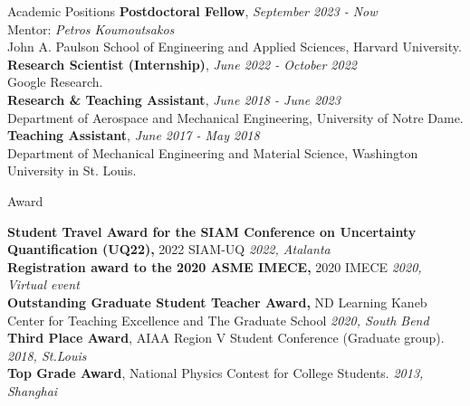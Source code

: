 \documentclass{resume} %
\begin{document}
\begin{rSection}{Academic Positions}
\textbf{Postdoctoral Fellow}, \hfill{\em September 2023 - Now}\\
Mentor: \textit{Petros Koumoutsakos}
\\John A. Paulson School of Engineering and Applied Sciences, Harvard University.\\	
\textbf{Research Scientist (Internship)}, \hfill{\em June 2022 - October 2022} 
\\Google Research.\\
\textbf{Research \& Teaching Assistant}, \hfill{\em June 2018 - June 2023}
\\Department of Aerospace and Mechanical Engineering, University of Notre Dame.\\
\textbf{Teaching Assistant}, \hfill {\em June 2017 - May 2018}
\\Department of Mechanical Engineering and Material Science, Washington University in St. Louis.
\end{rSection}
\begin{rSection}{Award}


{\bf Student Travel Award for the SIAM Conference on Uncertainty Quantification (UQ22),} 2022 SIAM-UQ \hfill {\em 2022, Atalanta}\\
{\bf Registration award to the 2020 ASME IMECE,} 2020 IMECE \hfill {\em 2020, Virtual event}\\
{\bf Outstanding Graduate Student Teacher Award,} ND Learning Kaneb Center for Teaching Excellence and The Graduate School \hfill {\em 2020, South Bend}\\
{\bf Third Place Award}, AIAA Region V Student Conference (Graduate group). \hfill {\em 2018, St.Louis}\\
{\bf Top Grade Award}, National Physics Contest for College Students. \hfill {\em 2013, Shanghai}
\end{rSection}




\end{document}

